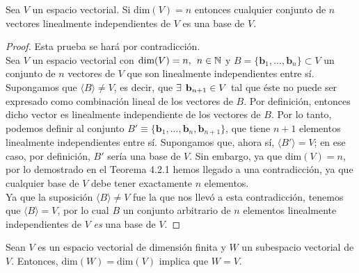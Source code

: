 \documentclass[notasLineal]{subfiles}
\begin{document}
\begin{Teo}\label{teo: Conjunto linealmente independiente con cardinalidad igual a la dimensión finita del espacio es una base}

    Sea $V$ un espacio vectorial. Si $\text{dim}(V)=n$ entonces cualquier conjunto de $n$ vectores linealmente independientes de $V$ es una base de $V$.

\begin{proof}

    Esta prueba se hará por contradicción. \\

    Sea $V$ un espacio vectorial con $\text{dim}(V)=n, \hspace{1.5mm} n\in\mathbb{N}$ y $B=\{\mathbf{b}_1, ..., \mathbf{b}_n\}\subset V$ un conjunto de $n$ vectores de $V$ que son linealmente independientes entre sí. \\

    Supongamos que $\langle B \rangle \neq V$, es decir, que $\exists\hspace{1.5mm} \mathbf{b}_{n+1}\in V$ tal que éste no puede ser expresado como combinación lineal de los vectores de $B$. Por definición, entonces dicho vector es linealmente independiente de los vectores de $B$. Por lo tanto, podemos definir al conjunto $B'\equiv\{\mathbf{b}_1, ...,\mathbf{b}_n, \mathbf{b}_{n+1}\}$, que tiene $n+1$ elementos linealmente independientes entre sí. Supongamos que, ahora sí, $\langle B' \rangle = V$; en ese caso, por definición, $B'$ sería una base de $V$. Sin embargo, ya que $\text{dim}(V)=n$, por lo demostrado en el Teorema 4.2.1 hemos llegado a una contradicción, ya que cualquier base de $V$ debe tener exactamente $n$ elementos. \\
    
    Ya que la suposición $\langle B \rangle \neq V$ fue la que nos llevó a esta contradicción, tenemos que $\langle B \rangle = V$, por lo cual $B$ \textemdash un conjunto arbitrario de $n$ elementos linealmente independientes de $V$\textemdash \hspace{1mm} \emph{es} una base de $V$.

\end{proof}

\end{Teo}

\begin{Coro}\label{coro: Subespacio igual a espacio de dimensión finita si sus dimensiones son iguales}
    Sean $V$ es un espacio vectorial de dimensión finita y $W$ un subespacio vectorial de $V$. Entonces, $\text{dim}(W)=\text{dim}(V)$ implica que $W=V$.
\end{Coro}
\end{document}
